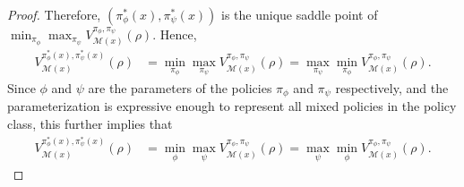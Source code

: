 \documentclass{article}
\theoremstyle{plain}
\theoremstyle{definition}
\theoremstyle{remark}
\def\cM{\mathcal M}
\begin{document}
\begin{proof}
Therefore, $(\pi_\phi^*(x), \pi_\psi^*(x))$ is the unique saddle point of $\min_{\pi_\phi}\max_{\pi_\psi}
V^{\pi_\phi,\pi_\psi}_{\cM(x)}(\rho)$. Hence,
    \begin{align}
        V^{\pi_\phi^*(x),\pi_\psi^*(x)}_{\cM(x)}(\rho) & = \min_{\pi_\phi} \max_{\pi_\psi}  V^{\pi_\phi,\pi_\psi}_{\cM(x)}(\rho)  = \max_{\pi_\psi} \min_{\pi_\phi} V^{\pi_\phi,\pi_\psi}_{\cM(x)}(\rho).
    \end{align}
    Since $\phi$ and $\psi$ are the parameters of the policies $\pi_\phi$ and $\pi_\psi$ respectively, and the parameterization is expressive enough to represent all mixed policies in the policy class, this further implies that
    \begin{align}
        V^{\pi_\phi^*(x),\pi_\psi^*(x)}_{\cM(x)}(\rho) & = \min_{\phi} \max_{\psi}  V^{\pi_\phi,\pi_\psi}_{\cM(x)}(\rho)  = \max_{\psi} \min_{\phi} V^{\pi_\phi,\pi_\psi}_{\cM(x)}(\rho).
    \end{align}

\end{proof}
\end{document}
